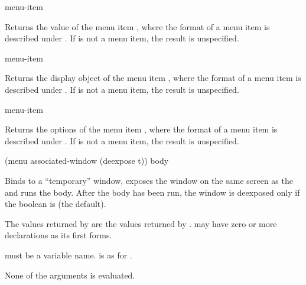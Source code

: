  {menu-item}

Returns the value of the menu item , where the format of a menu
item is described under .  If  is not a menu item,
the result is unspecified.

 {menu-item}

Returns the display object of the menu item , where the format of
a menu item is described under .  If  is not a
menu item, the result is unspecified.

 {menu-item}

Returns the options of the menu item , where the format of a menu
item is described under .  If  is not a menu
item, the result is unspecified.


 {(menu \optional associated-window \key (deexpose t))
                       \body body} 

Binds  to a ``temporary'' window, exposes the window on the same
screen as the  and runs the body.  After the body has
been run, the window is deexposed only if the boolean  is
 (the default).

The values returned by  are the values returned by .
 may have zero or more declarations as its first forms.

 must be a variable name.   is as for
.

None of the arguments is evaluated.
